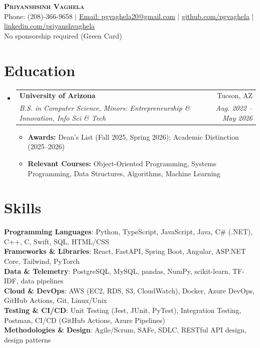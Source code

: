 \documentclass[letterpaper,10pt]{article}
\makeatletter
\newcommand{\resumeItem}[1]{
  \item\small{
    {#1 \vspace{-2pt}}
  }
}
\newcommand{\resumeSubheading}[4]{
  \vspace{-2pt}\item
    \begin{tabular*}{0.97\textwidth}[t]{l@{\extracolsep{\fill}}r}
      \textbf{#1} & #2 \\
      \textit{\small#3} & \textit{\small #4} \\
    \end{tabular*}\vspace{-7pt}
}
\newcommand{\resumeSubHeadingListStart}{\begin{itemize}[leftmargin=0.15in, label={}]}
\newcommand{\resumeSubHeadingListEnd}{\end{itemize}}
\newcommand{\resumeItemListStart}{\begin{itemize}}
\newcommand{\resumeItemListEnd}{\end{itemize}\vspace{-5pt}}
\makeatother
\begin{document}
\begin{center}
    \textbf{\Huge \scshape Priyanshsinh Vaghela} \\ \vspace{1pt}
    \small Phone: (208)-366-9658 $|$ \href{mailto:pgvaghela20@gmail.com}{\underline{Email: pgvaghela20@gmail.com}} $|$
    \href{https://github.com/pgvaghela}{\underline{github.com/pgvaghela}} $|$
    \href{https://www.linkedin.com/in/priyanshvaghela/}{\underline{linkedin.com/priyanshvaghela}} \\
    \small No sponsorship required (Green Card)
\end{center}


\section{Education}
  \resumeSubHeadingListStart
    \resumeSubheading
      {University of Arizona}{Tucson, AZ}
      {B.S. in Computer Science, Minors: Entrepreneurship \& Innovation, Info Sci \& Tech}{Aug. 2022 -- May 2026}
      \resumeItemListStart
      \resumeItem{\textbf{Awards:} Dean's List (Fall 2025, Spring 2026); Academic Distinction (2025--2026)}
      \resumeItem{\textbf{Relevant Courses:} Object-Oriented Programming, Systems Programming, Data Structures, Algorithms, Machine Learning}
      \resumeItemListEnd
  \resumeSubHeadingListEnd

  \vspace{-18pt}

\section{Skills}
 \begin{itemize}[leftmargin=0.15in, label={}]
    \small{\item
     \textbf{Programming Languages}{: Python, TypeScript, JavaScript, Java, C\# (.NET), C++, C, Swift, SQL, HTML/CSS} \\
     \textbf{Frameworks \& Libraries}{: React, FastAPI, Spring Boot, Angular, ASP.NET Core, Tailwind, PyTorch} \\
     \textbf{Data \& Telemetry}{: PostgreSQL, MySQL, pandas, NumPy, scikit-learn, TF-IDF, data pipelines} \\
     \textbf{Cloud \& DevOps}{: AWS (EC2, RDS, S3, CloudWatch), Docker, Azure DevOps, GitHub Actions, Git, Linux/Unix} \\
     \textbf{Testing \& CI/CD}{: Unit Testing (Jest, JUnit, PyTest), Integration Testing, Postman, CI/CD (GitHub Actions, Azure Pipelines)} \\
     \textbf{Methodologies \& Design}{: Agile/Scrum, SAFe, SDLC, RESTful API design, design patterns} \\
    }
\end{itemize}
\end{document}
